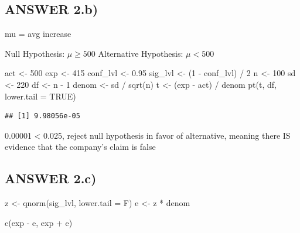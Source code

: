 \documentclass[
]{article}
\newenvironment{Shaded}{\begin{snugshade}}{\end{snugshade}}
\newcommand{\AttributeTok}[1]{\textcolor[rgb]{0.77,0.63,0.00}{#1}}
\newcommand{\ConstantTok}[1]{\textcolor[rgb]{0.00,0.00,0.00}{#1}}
\newcommand{\DecValTok}[1]{\textcolor[rgb]{0.00,0.00,0.81}{#1}}
\newcommand{\FloatTok}[1]{\textcolor[rgb]{0.00,0.00,0.81}{#1}}
\newcommand{\FunctionTok}[1]{\textcolor[rgb]{0.00,0.00,0.00}{#1}}
\newcommand{\NormalTok}[1]{#1}
\newcommand{\OtherTok}[1]{\textcolor[rgb]{0.56,0.35,0.01}{#1}}
\newcommand{\SpecialCharTok}[1]{\textcolor[rgb]{0.00,0.00,0.00}{#1}}
\begin{document}
\hypertarget{answer-2.b}{%
\subsection{ANSWER 2.b)}\label{answer-2.b}}

mu = avg increase

Null Hypothesis: \(\mu \ge 500\) Alternative Hypothesis: \(\mu \lt 500\)

\begin{Shaded}
\begin{Highlighting}[]
\NormalTok{act }\OtherTok{\textless{}{-}} \DecValTok{500}
\NormalTok{exp }\OtherTok{\textless{}{-}} \DecValTok{415}
\NormalTok{conf\_lvl }\OtherTok{\textless{}{-}} \FloatTok{0.95}
\NormalTok{sig\_lvl }\OtherTok{\textless{}{-}}\NormalTok{ (}\DecValTok{1} \SpecialCharTok{{-}}\NormalTok{ conf\_lvl) }\SpecialCharTok{/} \DecValTok{2}
\NormalTok{n }\OtherTok{\textless{}{-}} \DecValTok{100}
\NormalTok{sd }\OtherTok{\textless{}{-}} \DecValTok{220}
\NormalTok{df }\OtherTok{\textless{}{-}}\NormalTok{ n }\SpecialCharTok{{-}} \DecValTok{1}
\NormalTok{denom  }\OtherTok{\textless{}{-}}\NormalTok{ sd }\SpecialCharTok{/} \FunctionTok{sqrt}\NormalTok{(n)}
\NormalTok{t }\OtherTok{\textless{}{-}}\NormalTok{ (exp }\SpecialCharTok{{-}}\NormalTok{ act) }\SpecialCharTok{/}\NormalTok{ denom}
\FunctionTok{pt}\NormalTok{(t, df, }\AttributeTok{lower.tail =} \ConstantTok{TRUE}\NormalTok{)}
\end{Highlighting}
\end{Shaded}

\begin{verbatim}
## [1] 9.98056e-05
\end{verbatim}

0.00001 \textless{} 0.025, reject null hypothesis in favor of
alternative, meaning there IS evidence that the company's claim is false

\hypertarget{answer-2.c}{%
\subsection{ANSWER 2.c)}\label{answer-2.c}}

\begin{Shaded}
\begin{Highlighting}[]
\NormalTok{z }\OtherTok{\textless{}{-}} \FunctionTok{qnorm}\NormalTok{(sig\_lvl, }\AttributeTok{lower.tail =}\NormalTok{ F)}
\NormalTok{e }\OtherTok{\textless{}{-}}\NormalTok{ z }\SpecialCharTok{*}\NormalTok{ denom}

\FunctionTok{c}\NormalTok{(exp }\SpecialCharTok{{-}}\NormalTok{ e, exp }\SpecialCharTok{+}\NormalTok{ e)}
\end{Highlighting}
\end{Shaded}
\end{document}
